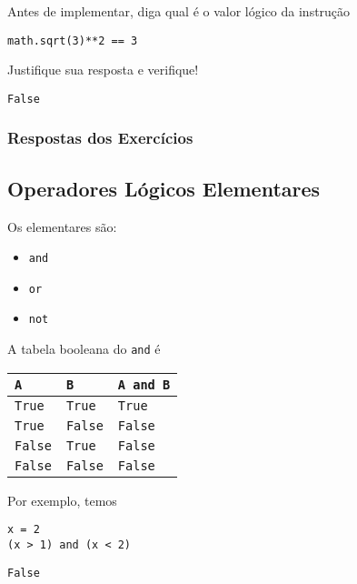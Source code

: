 \begin{exer}
  Antes de implementar, diga qual é o valor lógico da instrução

\begin{lstlisting}
math.sqrt(3)**2 == 3
\end{lstlisting}

Justifique sua resposta e verifique!
\end{exer}
\begin{resp}
\texttt{False}
\end{resp}

\ifisbook 
\subsubsection*{Respostas dos Exercícios}
\shipoutAnswer
\fi

\subsection{Operadores Lógicos Elementares}

Os  elementares são:
\begin{itemize}
\item[]\texttt{and} 
\item[]\texttt{or} 
\item[]\texttt{not} 
\end{itemize}

\begin{ex}
  A tabela booleana{\boole} do \texttt{and} é
  \begin{center}
    \begin{tabular}[H]{ll|l}
      \texttt{A} & \texttt{B} & \texttt{A and B}\\\hline
      \texttt{True} & \texttt{True} & \texttt{True} \\
      \texttt{True} & \texttt{False} & \texttt{False} \\
      \texttt{False} & \texttt{True} & \texttt{False} \\
      \texttt{False} & \texttt{False} & \texttt{False} \\\hline
    \end{tabular}
  \end{center}

  Por exemplo, temos

\begin{lstlisting}
x = 2
(x > 1) and (x < 2)
\end{lstlisting}

\begin{verbatim}
False
\end{verbatim}

\end{ex}

